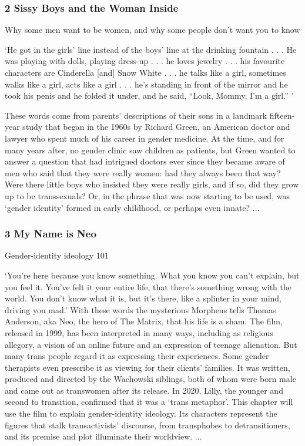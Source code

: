 \documentclass[10pt,titlepage]{book}
\begin{document}
\subsubsection{2 Sissy Boys and the Woman Inside}

Why some men want to be women, and why some people don’t want you to know

‘He got in the girls’ line instead of the boys’ line at the drinking fountain . . . He was playing with dolls, playing dress-up . . . he loves jewelry . . . his favourite characters are Cinderella [and] Snow White . . . he talks like a girl, sometimes walks like a girl, acts like a girl . . . he’s standing in front of the mirror and he took his penis and he folded it under, and he said, “Look, Mommy, I’m a girl.” ’

These words come from parents’ descriptions of their sons in a landmark fifteen-year study that began in the 1960s by Richard Green, an American doctor and lawyer who spent much of his career in gender medicine. At the time, and for many years after, no gender clinic saw children as patients, but Green wanted to answer a question that had intrigued doctors ever since they became aware of men who said that they were really women: had they always been that way? Were there little boys who insisted they were really girls, and if so, did they grow up to be transsexuals? Or, in the phrase that was now starting to be used, was ‘gender identity’ formed in early childhood, or perhaps even innate?
...

\subsubsection{3 My Name is Neo}

Gender-identity ideology 101

‘You’re here because you know something. What you know you can’t explain, but you feel it. You’ve felt it your entire life, that there’s something wrong with the world. You don’t know what it is, but it’s there, like a splinter in your mind, driving you mad.’ With these words the mysterious Morpheus tells Thomas Anderson, aka Neo, the hero of The Matrix, that his life is a sham. The film, released in 1999, has been interpreted in many ways, including as religious allegory, a vision of an online future and an expression of teenage alienation. But many trans people regard it as expressing their experiences. Some gender therapists even prescribe it as viewing for their clients’ families. It was written, produced and directed by the Wachowski siblings, both of whom were born male and came out as transwomen after its release. In 2020, Lilly, the younger and second to transition, confirmed that it was a ‘trans metaphor’. This chapter will use the film to explain gender-identity ideology. Its characters represent the figures that stalk transactivists’ discourse, from transphobes to detransitioners, and its premise and plot illuminate their worldview.
...
\end{document}
